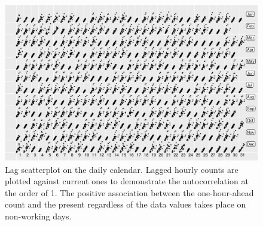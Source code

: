 \documentclass[article]{jss}
\begin{document}
\begin{CodeChunk}
\begin{figure}

{\centering \includegraphics[width=\textwidth]{figure/scatterplot-1} 

}

\caption[Lag scatterplot on the daily calendar]{Lag scatterplot on the daily calendar. Lagged hourly counts are plotted against current ones to demonstrate the autocorrelation at the order of 1. The positive association between the one-hour-ahead count and the present regardless of the data values takes place on non-working days.}\label{fig:scatterplot}
\end{figure}
\end{CodeChunk}
\end{document}
